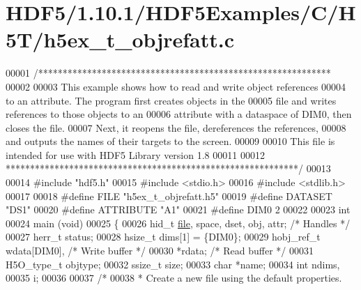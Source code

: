 \hypertarget{_h_d_f5_21_810_81_2_h_d_f5_examples_2_c_2_h5_t_2h5ex__t__objrefatt_8c_source}{}\section{H\+D\+F5/1.10.1/\+H\+D\+F5\+Examples/\+C/\+H5\+T/h5ex\+\_\+t\+\_\+objrefatt.c}
\label{_h_d_f5_21_810_81_2_h_d_f5_examples_2_c_2_h5_t_2h5ex__t__objrefatt_8c_source}

\begin{DoxyCode}
00001 \textcolor{comment}{/************************************************************}
00002 \textcolor{comment}{}
00003 \textcolor{comment}{  This example shows how to read and write object references}
00004 \textcolor{comment}{  to an attribute.  The program first creates objects in the}
00005 \textcolor{comment}{  file and writes references to those objects to an}
00006 \textcolor{comment}{  attribute with a dataspace of DIM0, then closes the file.}
00007 \textcolor{comment}{  Next, it reopens the file, dereferences the references,}
00008 \textcolor{comment}{  and outputs the names of their targets to the screen.}
00009 \textcolor{comment}{}
00010 \textcolor{comment}{  This file is intended for use with HDF5 Library version 1.8}
00011 \textcolor{comment}{}
00012 \textcolor{comment}{ ************************************************************/}
00013 
00014 \textcolor{preprocessor}{#include "hdf5.h"}
00015 \textcolor{preprocessor}{#include <stdio.h>}
00016 \textcolor{preprocessor}{#include <stdlib.h>}
00017 
00018 \textcolor{preprocessor}{#define FILE            "h5ex\_t\_objrefatt.h5"}
00019 \textcolor{preprocessor}{#define DATASET         "DS1"}
00020 \textcolor{preprocessor}{#define ATTRIBUTE       "A1"}
00021 \textcolor{preprocessor}{#define DIM0            2}
00022 
00023 \textcolor{keywordtype}{int}
00024 main (\textcolor{keywordtype}{void})
00025 \{
00026     hid\_t       \hyperlink{structfile}{file}, space, dset, obj, attr;   \textcolor{comment}{/* Handles */}
00027     herr\_t      status;
00028     hsize\_t     dims[1] = \{DIM0\};
00029     hobj\_ref\_t  wdata[DIM0],                    \textcolor{comment}{/* Write buffer */}
00030                 *rdata;                         \textcolor{comment}{/* Read buffer */}
00031     H5O\_type\_t  objtype;
00032     ssize\_t     size;
00033     \textcolor{keywordtype}{char}        *name;
00034     \textcolor{keywordtype}{int}         ndims,
00035                 i;
00036 
00037     \textcolor{comment}{/*}
00038 \textcolor{comment}{     * Create a new file using the default properties.}

\end{DoxyCode}
